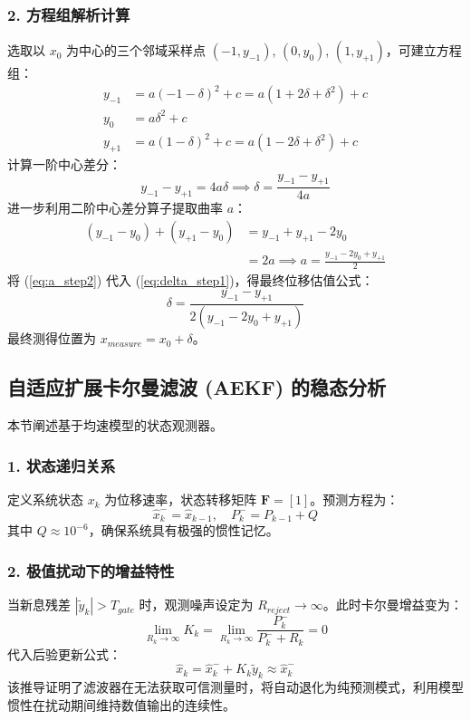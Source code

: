 \documentclass[twocolumn, a4paper, 10pt]{article}
\begin{document}
\subsubsection{2. 方程组解析计算}
选取以 $x_0$ 为中心的三个邻域采样点 $(-1, y_{-1})$, $(0, y_0)$, $(1, y_{+1})$，可建立方程组：
\begin{align}
    y_{-1}   & = a(-1 - \delta)^2 + c = a(1 + 2\delta + \delta^2) + c \\
    y_{0} \  & = a\delta^2 + c                                        \\
    y_{+1}   & = a(1 - \delta)^2 + c = a(1 - 2\delta + \delta^2) + c
\end{align}
计算一阶中心差分：
\begin{equation}
    y_{-1} - y_{+1} = 4a\delta \implies \delta = \frac{y_{-1} - y_{+1}}{4a}
    \label{eq:delta_step1}
\end{equation}
进一步利用二阶中心差分算子提取曲率 $a$：
\begin{align}
    (y_{-1} - y_0) + (y_{+1} - y_0) & = y_{-1} + y_{+1} - 2y_0 \nonumber                 \\
                                    & = 2a \implies a = \frac{y_{-1} - 2y_0 + y_{+1}}{2}
    \label{eq:a_step2}
\end{align}
将 (\ref{eq:a_step2}) 代入 (\ref{eq:delta_step1})，得最终位移估值公式：
\begin{equation}
    \delta = \frac{y_{-1} - y_{+1}}{2(y_{-1} - 2y_0 + y_{+1})}
\end{equation}
最终测得位置为 $x_{measure} = x_0 + \delta$。

\subsection{自适应扩展卡尔曼滤波 (AEKF) 的稳态分析}
本节阐述基于均速模型的状态观测器。

\subsubsection{1. 状态递归关系}
定义系统状态 $x_k$ 为位移速率，状态转移矩阵 $\mathbf{F} = [1]$。预测方程为：
\begin{equation}
    \hat{x}_k^- = \hat{x}_{k-1}, \quad P_k^- = P_{k-1} + Q
\end{equation}
其中 $Q \approx 10^{-6}$，确保系统具有极强的惯性记忆。

\subsubsection{2. 极值扰动下的增益特性}
当新息残差 $|\tilde{y}_k| > T_{gate}$ 时，观测噪声设定为 $R_{reject} \to \infty$。此时卡尔曼增益变为：
\begin{equation}
    \lim_{R_k \to \infty} K_k = \lim_{R_k \to \infty} \frac{P_k^-}{P_k^- + R_k} = 0
\end{equation}
代入后验更新公式：
\begin{equation}
    \hat{x}_k = \hat{x}_k^- + K_k \tilde{y}_k \approx \hat{x}_k^-
\end{equation}
该推导证明了滤波器在无法获取可信测量时，将自动退化为纯预测模式，利用模型惯性在扰动期间维持数值输出的连续性。
\end{document}
